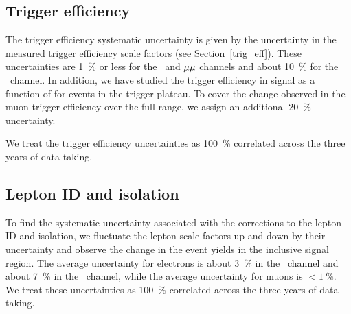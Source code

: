 \subsection{Trigger efficiency}
The trigger efficiency systematic uncertainty is given by the uncertainty in the measured trigger efficiency scale factors (see Section~\ref{trig_eff}). These uncertainties are \SI{1}{\percent} or less for the \Pe\Pgm\ and ${\mu}{\mu}$ channels and about \SI{10}{\percent} for the \Pe\Pe\ channel. In addition, we have studied the trigger efficiency in signal as a function of \ad for events in the trigger \pt plateau. To cover the change observed in the muon trigger efficiency over the full \ad range, we assign an additional \SI{20}{\percent} uncertainty.

We treat the trigger efficiency uncertainties as \SI{100}{\percent} correlated across the three years of data taking.

\subsection{Lepton ID and isolation}
To find the systematic uncertainty associated with the corrections to the lepton ID and isolation, we fluctuate the lepton scale factors up and down by their uncertainty and observe the change in the event yields in the inclusive signal region. The average uncertainty for electrons is about \SI{3}{\percent} in the \Pe\Pgm\ channel and about \SI{7}{\percent} in the \Pe\Pe\ channel, while the average uncertainty for muons is $< \SI{1}{\percent}$. We treat these uncertainties as \SI{100}{\percent} correlated across the three years of data taking.

